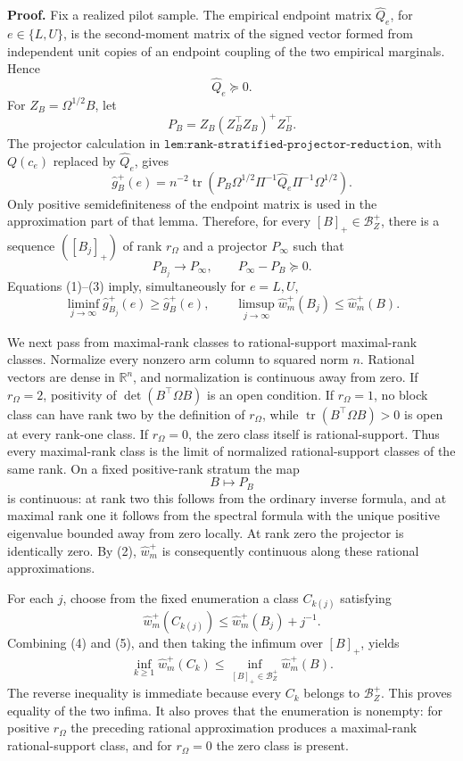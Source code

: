 \textbf{Proof.}
Fix a realized pilot sample.  The empirical endpoint matrix \(\widehat Q_e\), for \(e\in\{L,U\}\), is the second-moment matrix of the signed vector formed from independent unit copies of an endpoint coupling of the two empirical marginals.  Hence
\[
\widehat Q_e\succeq0.
\tag{1}
\]
For \(Z_B=\Omega^{1/2}B\), let
\[
P_B=Z_B(Z_B^{\top}Z_B)^+Z_B^{\top}.
\]
The projector calculation in \(\texttt{lem:rank-stratified-projector-reduction}\), with \(Q(c_e)\) replaced by \(\widehat Q_e\), gives
\[
\widehat g_B^+(e)
=n^{-2}\operatorname{tr}\!\left(
P_B\Omega^{1/2}\Pi^{-1}\widehat Q_e
\Pi^{-1}\Omega^{1/2}
\right).
\tag{2}
\]
Only positive semidefiniteness of the endpoint matrix is used in the approximation part of that lemma.  Therefore, for every \([B]_+\in\mathcal B_Z^+\), there is a sequence \(([B_j]_+)\) of rank \(r_\Omega\) and a projector \(P_\infty\) such that
\[
P_{B_j}\longrightarrow P_\infty,
\qquad P_\infty-P_B\succeq0.
\tag{3}
\]
Equations (1)--(3) imply, simultaneously for \(e=L,U\),
\[
\liminf_{j\to\infty}\widehat g_{B_j}^+(e)
\ge \widehat g_B^+(e),
\qquad
\limsup_{j\to\infty}\widehat w_m^+(B_j)
\le \widehat w_m^+(B).
\tag{4}
\]

We next pass from maximal-rank classes to rational-support maximal-rank classes.  Normalize every nonzero arm column to squared norm \(n\).  Rational vectors are dense in \(\mathbb R^n\), and normalization is continuous away from zero.  If \(r_\Omega=2\), positivity of \(\det(B^{\top}\Omega B)\) is an open condition.  If \(r_\Omega=1\), no block class can have rank two by the definition of \(r_\Omega\), while \(\operatorname{tr}(B^{\top}\Omega B)>0\) is open at every rank-one class.  If \(r_\Omega=0\), the zero class itself is rational-support.  Thus every maximal-rank class is the limit of normalized rational-support classes of the same rank.  On a fixed positive-rank stratum the map
\[
B\longmapsto P_B
\]
is continuous: at rank two this follows from the ordinary inverse formula, and at maximal rank one it follows from the spectral formula with the unique positive eigenvalue bounded away from zero locally.  At rank zero the projector is identically zero.  By (2), \(\widehat w_m^+\) is consequently continuous along these rational approximations.

For each \(j\), choose from the fixed enumeration a class \(C_{k(j)}\) satisfying
\[
\widehat w_m^+(C_{k(j)})
\le \widehat w_m^+(B_j)+j^{-1}.
\tag{5}
\]
Combining (4) and (5), and then taking the infimum over \([B]_+\), yields
\[
\inf_{k\ge1}\widehat w_m^+(C_k)
\le \inf_{[B]_+\in\mathcal B_Z^+}\widehat w_m^+(B).
\tag{6}
\]
The reverse inequality is immediate because every \(C_k\) belongs to \(\mathcal B_Z^+\).  This proves equality of the two infima.  It also proves that the enumeration is nonempty: for positive \(r_\Omega\) the preceding rational approximation produces a maximal-rank rational-support class, and for \(r_\Omega=0\) the zero class is present.

